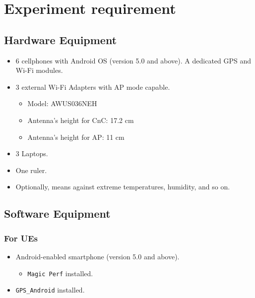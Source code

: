 \hypertarget{experiment-requirement}{%
\section{Experiment requirement}\label{experiment-requirement}}

\hypertarget{hardware-equipment}{%
\subsection{Hardware Equipment}\label{hardware-equipment}}

\begin{itemize}
\tightlist
\item
  6 cellphones with Android OS (version 5.0 and above). A dedicated GPS
  and Wi-Fi modules.
\item
  3 external Wi-Fi Adapters with AP mode capable.

  \begin{itemize}
  \tightlist
  \item
    Model: AWUS036NEH
  \item
    Antenna's height for CnC: 17.2 cm
  \item
    Antenna's height for AP: 11 cm
  \end{itemize}
\item
  3 Laptops.
\item
  One ruler.
\item
  Optionally, means against extreme temperatures, humidity, and so on.
\end{itemize}

\hypertarget{software-equipment}{%
\subsection{Software Equipment}\label{software-equipment}}

\hypertarget{for-ues}{%
\subsubsection{For UEs}\label{for-ues}}

\begin{itemize}
\tightlist
\item
  Android-enabled smartphone (version 5.0 and above).

  \begin{itemize}
  \tightlist
  \item
    \texttt{Magic\ Perf} installed.
  \end{itemize}
\item
  \texttt{GPS\_Android} installed.
\end{itemize}

